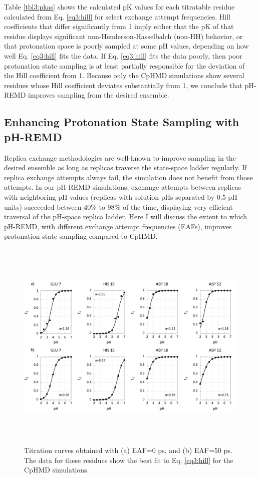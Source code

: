 Table \ref{tbl3:pkas} shows the calculated pK values for each titratable
residue calculated from Eq. \ref{eq3:hill} for select exchange attempt
frequencies.  Hill coefficients that differ significantly from 1 imply either
that the pK of that residue displays significant
non-Henderson-Hasselbalch (non-HH) behavior, or that protonation space is poorly
sampled at some pH values, depending on how well Eq. \ref{eq3:hill} fits the
data. If Eq. \ref{eq3:hill} fits the data poorly, then poor protonation state
sampling is at least partially responsible for the deviation of the Hill
coefficient from 1. Because only the CpHMD simulations show several residues
whose Hill coefficient deviates substantially from 1, we conclude that pH-REMD
improves sampling from the desired ensemble.

\subsection{Enhancing Protonation State Sampling with pH-REMD}

Replica exchange methodologies are well-known to improve sampling in the desired
ensemble \cite{Sugita_ChemPhysLett_1999_v314_p141,
Chodera_JChemPhys_2011_v135_p194110} as long as replicas traverse the
state-space ladder regularly.  If replica exchange attempts always fail, the
simulation does not benefit from those attempts.  In our pH-REMD simulations,
exchange attempts between replicas with neighboring pH values (\ie replicas with
solution pHs separated by 0.5 pH units) succeeded between 40\% to 98\% of the
time, displaying very efficient traversal of the pH-space replica ladder. Here I
will discuss the extent to which pH-REMD, with different exchange attempt
frequencies (EAFs), improves protonation state sampling compared to CpHMD.

\begin{figure}
 \includegraphics[width=6.5in, height=4.06in]{Comparison_good_curves.png}
 \caption{Titration curves obtained with (a) EAF=0 ps, and (b) EAF=50
          ps. The data for these residues show the best fit to Eq.
          \ref{eq3:hill} for the CpHMD simulations.}
 \label{fig3:GoodTitr}
\end{figure}

